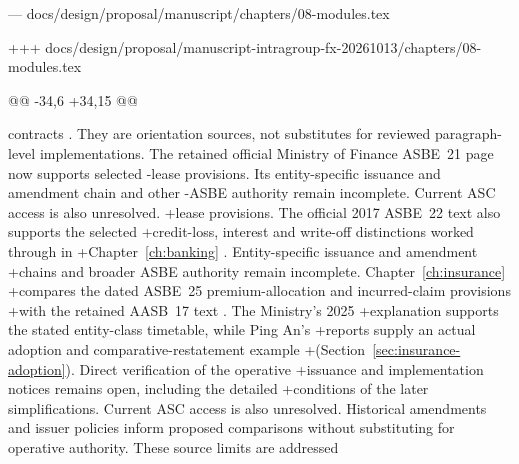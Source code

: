 --- docs/design/proposal/manuscript/chapters/08-modules.tex

+++ docs/design/proposal/manuscript-intragroup-fx-20261013/chapters/08-modules.tex

@@ -34,6 +34,15 @@

 contracts \citep{ifrs9,ias32,ifrs17}. They are orientation sources, not substitutes
 for reviewed paragraph-level implementations. The retained official Ministry of Finance ASBE~21 page now supports selected
-lease provisions. Its entity-specific issuance and amendment chain and other
-ASBE authority remain incomplete. Current ASC access is also unresolved.
+lease provisions. The official 2017 ASBE~22 text also supports the selected
+credit-loss, interest and write-off distinctions worked through in
+Chapter~\ref{ch:banking} \citep{mofasbe22}. Entity-specific issuance and amendment
+chains and broader ASBE authority remain incomplete. Chapter~\ref{ch:insurance}
+compares the dated ASBE~25 premium-allocation and incurred-claim provisions
+with the retained AASB~17 text \citep{mofasbe25}. The Ministry's 2025
+explanation supports the stated entity-class timetable, while Ping An's
+reports supply an actual adoption and comparative-restatement example
+(Section~\ref{sec:insurance-adoption}). Direct verification of the operative
+issuance and implementation notices remains open, including the detailed
+conditions of the later simplifications. Current ASC access is also unresolved.
 Historical amendments and issuer policies inform proposed comparisons without
 substituting for operative authority. These source limits are addressed
